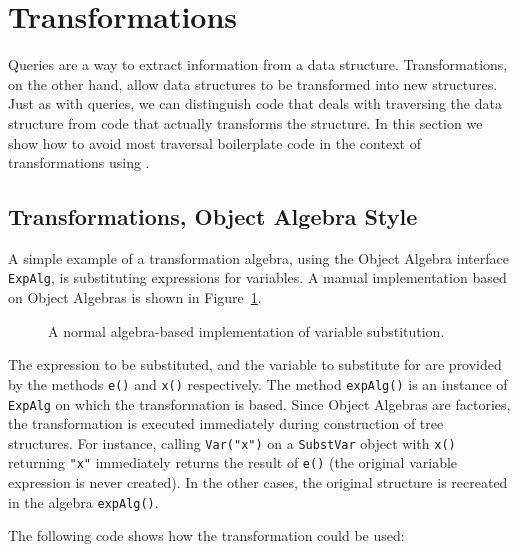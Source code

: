 \section{Transformations}\label{sec:transformations}
\label{retroimp}

Queries are a way to extract information from a data structure.
Transformations, on the other hand, allow data structures to be
transformed into new structures. Just as with queries, we can distinguish code that deals with
traversing the data structure from code that actually transforms the
structure. In this section we show how to avoid most traversal
boilerplate code in the context of transformations using \name.


\subsection{Transformations, Object Algebra Style}\label{subsec:substvars}

A simple example of a transformation algebra, using the Object
Algebra interface \lstinline{ExpAlg}, is substituting expressions for
variables. A manual implementation based on Object Algebras is shown
in Figure~\ref{substvars_without_id}.

\begin{figure}[t]
\nocaptionrule
\caption{A normal algebra-based implementation of variable substitution.}
\label{substvars_without_id}
\end{figure}

The expression to be substituted, and the variable to substitute for
are provided by the methods \lstinline{e()} and \lstinline{x()}
respectively. The method \lstinline{expAlg()} is an instance of
\lstinline{ExpAlg} on which the transformation is based. Since Object
Algebras are factories, the transformation is executed immediately
during construction of tree structures. For instance, calling \lstinline{Var("x")} on a
\lstinline{SubstVar} object with \lstinline{x()} returning
\lstinline{"x"} immediately returns the result of \lstinline{e()}
(the original variable expression is never created). In the other
cases, the original structure is recreated in the algebra
\lstinline{expAlg()}.

The following code shows how the transformation could be used:


